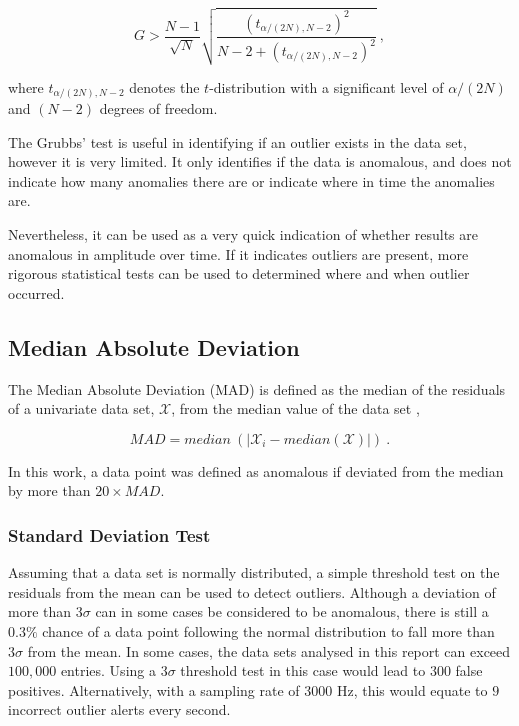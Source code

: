 \begin{equation}
    G > \dfrac{N-1}{\sqrt{N}} \sqrt{\dfrac{(t_{\alpha/(2N), N-2})^2}{N-2+(t_{\alpha/(2N), N-2})^2}} ~,
    \label{grubbs_condition}
\end{equation}

where $t_{\alpha/(2N), N-2}$ denotes the $t$-distribution with a significant level of $\alpha/(2N)$ and $(N-2)$ degrees of freedom. 

The Grubbs' test is useful in identifying if an outlier exists in the data set, however it is very limited. It only identifies if the data is anomalous, and does not indicate how many anomalies there are or indicate where in time the anomalies are.

Nevertheless, it can be used as a very quick indication of whether results are anomalous in amplitude over time. If it indicates outliers are present, more rigorous statistical tests can be used to determined where and when outlier occurred. 

\subsection{Median Absolute Deviation}

The Median Absolute Deviation (MAD) is defined as the median of the residuals of a univariate data set, $\mathcal{X}$, from the median value of the data set \cite{rousseeuw1993alternatives},

\begin{equation}
    MAD = median~(|\mathcal{X}_i - median(\mathcal{X})|)~.
    \label{eq:MAD}
\end{equation}

In this work, a data point was defined as anomalous if deviated from the median by more than $20 \times MAD$.

\subsubsection{Standard Deviation Test}
Assuming that a data set is normally distributed, a simple threshold test on the residuals from the mean can be used to detect outliers. 
Although a deviation of more than $3\sigma$ can in some cases be considered to be anomalous, there is still a $0.3\%$ chance of a data point following the normal distribution to fall more than $3\sigma$ from the mean. In some cases, the data sets analysed in this report can exceed $100,000$ entries. Using a $3\sigma$ threshold test in this case would lead to $300$ false positives. Alternatively, with a sampling rate of $3000$ Hz, this would equate to $9$ incorrect outlier alerts every second. 

